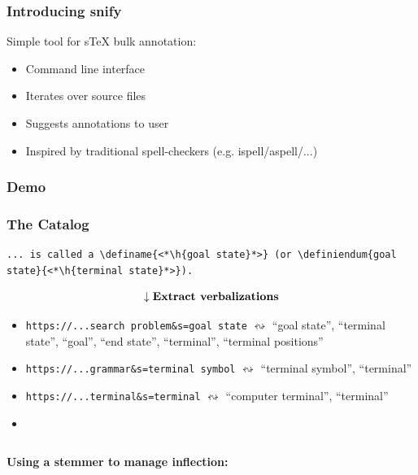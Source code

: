 \documentclass[aspectratio=169]{beamer}
\begin{document}
\begin{frame}
    \frametitle{Introducing snify}
    Simple tool for sTeX bulk annotation:
    \begin{itemize}
        \item Command line interface
        \item Iterates over source files
        \item Suggests annotations to user
        \item Inspired by traditional spell-checkers (e.g. ispell/aspell/...)
    \end{itemize}
\end{frame}

\begin{frame}
    \frametitle{Demo}
\end{frame}

\begin{frame}[fragile]
    \frametitle{The Catalog}
    \def\h#1{\colorbox{yellow!70!red!70}{#1}}
    \begin{lstlisting}
... is called a \definame{<*\h{goal state}*>} (or \definiendum{goal state}{<*\h{terminal state}*>}).
    \end{lstlisting}
    \[\downarrow\text{\bf Extract verbalizations}\]
    \vspace{-1.5em}
    \begin{itemize}
        \item {\color{blue}\verb|https://...search problem&s=goal state|} $\leftrightsquigarrow$ ``goal state'', ``terminal state'', \pause ``goal'', ``end state'', ``terminal'', ``terminal positions''
        \item {\color{blue}\verb|https://...grammar&s=terminal symbol|} $\leftrightsquigarrow$ ``terminal symbol'', ``terminal''
        \item {\color{blue}\verb|https://...terminal&s=terminal|} $\leftrightsquigarrow$ ``computer terminal'', ``terminal''
        \item \textellipsis
    \end{itemize}
    \pause
    \par\vspace{1em}
    \begin{columns}
    \textbf{Using a stemmer to manage inflection:}
    \hfill
    \end{columns}
\end{frame}
\end{document}
